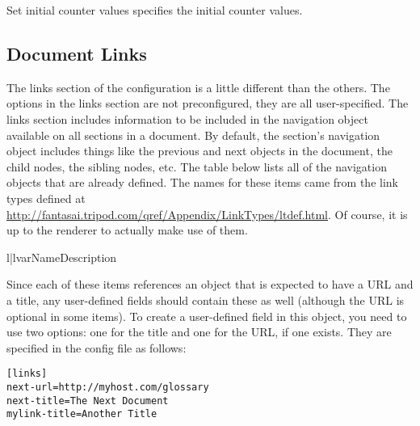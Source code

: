 \begin{configuration}{Set initial counter values}
specifies the initial counter values.
\end{configuration}


\subsection{Document Links\label{sec:config-links}}

The links section of the configuration is a little different than the
others.  The options in the links section are not preconfigured, they
are all user-specified.  The links section includes information
to be included in the navigation object available on all sections in
a document.  By default, the section's navigation object includes things
like the previous and next objects in the document, the child nodes,
the sibling nodes, etc.  The table below lists all of the navigation
objects that are already defined.  The names for these items came from
the link types defined at \url{http://fantasai.tripod.com/qref/Appendix/LinkTypes/ltdef.html}.  Of course, it is up to the renderer to actually make use
of them.

\begin{tableii}{l|l}{var}{Name}{Description}
\end{tableii}

Since each of these items references an object that is expected to have
a URL and a title, any user-defined fields should contain these as well
(although the URL is optional in some items).  To create a user-defined
field in this object, you need to use two options: one for the title
and one for the URL, if one exists.  They are specified in the config
file as follows:
\begin{verbatim}
[links]
next-url=http://myhost.com/glossary
next-title=The Next Document
mylink-title=Another Title
\end{verbatim}

